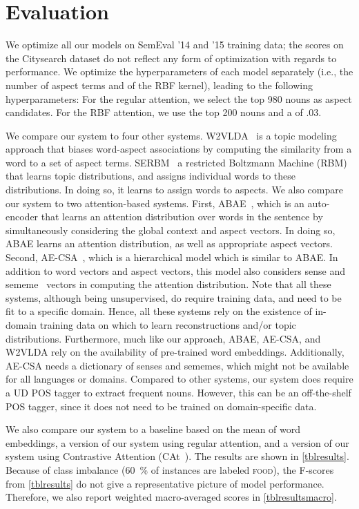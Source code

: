 \documentclass[11pt,a4paper]{article}
\newlength{\catheight}
\newcommand{\ourmodel}{CAt~\raisebox{-0.1ex}{\texttt{[image: fig/cat]}}} \definecolor{aspectcolor}{HTML}{fb7e5e}
\begin{document}
\section{Evaluation}

We optimize all our models on SemEval '14 and '15 training data;
the scores on the Citysearch dataset do not reflect any form of optimization with regards to performance.
We optimize the hyperparameters of each model separately
(i.e., the number of aspect terms and  of the RBF kernel), leading to the following hyperparameters:
For the regular attention, we select the top 980 nouns as aspect candidates.
For the RBF attention, we use the top 200 nouns and a  of .03.

We compare our system to four other systems.
W2VLDA~\citep{garcia2018w2vlda} is a topic modeling approach that biases word-aspect associations by computing the similarity from a word to a set of aspect terms.
SERBM~\citep{wang2015sentiment} a restricted Boltzmann Machine (RBM) that learns topic distributions, and assigns individual words to these distributions. 
In doing so, it learns to assign words to aspects.
We also compare our system to two attention-based systems. First, ABAE~\citep{he2017unsupervised}, which is an auto-encoder that learns an attention distribution over words in the sentence by simultaneously considering the global context and aspect vectors.
In doing so, ABAE learns an attention distribution, as well as appropriate aspect vectors.
Second, AE-CSA~\cite{luo2019unsupervised}, which is a hierarchical model which is similar to ABAE. 
In addition to word vectors and aspect vectors, this model also considers sense and sememe~\cite{bloomfield1926set} vectors in computing the attention distribution.
Note that all these systems, although being unsupervised, do require training data, and need to be fit to a specific domain.
Hence, all these systems rely on the existence of in-domain training data on which to learn reconstructions and/or topic distributions.
Furthermore, much like our approach, ABAE, AE-CSA, and W2VLDA rely on the availability of pre-trained word embeddings.
Additionally, AE-CSA needs a dictionary of senses and sememes, which might not be available for all languages or domains.
Compared to other systems, our system does require a UD POS tagger to extract frequent nouns.
However, this can be an off-the-shelf POS tagger, since it does not need to be trained on domain-specific data.

We also compare our system to a baseline based on the mean of word embeddings, a version of our system using regular attention, and a version of our system using Contrastive Attention (\ourmodel).
The results are shown in \autoref{tblresults}.
Because of class imbalance
(60~\% of instances are labeled \textsc{food}),
the F-scores from \ref{tblresults} do not give a representative
picture of model performance.
Therefore, we also report weighted macro-averaged scores in \autoref{tblresultsmacro}.
\end{document}
